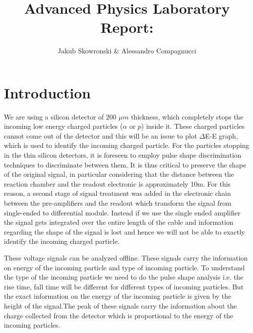 \documentclass[a4paper, 11pt]{article}
\author{Jakub Skowronski & Alessandro Compagnucci}
\title{Advanced Physics Laboratory Report:}
\begin{document}
\maketitle

\section{Introduction}
 \paragraph{}
 
We are using a silicon detector of $200$ $\mu$$m$ thickness, which completely stops the incoming low energy charged particles ($\alpha$ or $p$) inside it. These charged particles cannot come out of the detector and this will be an issue to plot $\Delta$E-E graph, which is used to identify the incoming charged particle. For the particles stopping in the thin silicon detectors, it is foreseen to employ pulse shape discrimination techniques to discriminate between them. It is thus critical to preserve the shape of the original signal, in particular considering that the distance between the reaction chamber and the readout electronic is approximately 10m. For this reason, a second stage of signal treatment was added in the electronic chain between the pre-amplifiers and the readout which transform the signal from single-ended to differential module. Instead if we use the single ended amplifier the signal gets integrated over the entire length of the cable and information regarding the shape of the signal is lost and hence we will not be able to exactly identify the incoming charged particle.
         
These voltage signals can be analyzed offline. These signals carry the information on energy of the incoming particle and type of incoming particle.  To understand the type of the incoming particle we need to do the pulse shape analysis i.e. the rise time, fall time will be different for different types of incoming particles. But the exact information on the energy of the incoming particle is given by the height of the signal.The peak of these signals carry the information about the charge collected from the detector which is proportional to the energy of the incoming particles.
 
\end{document}
